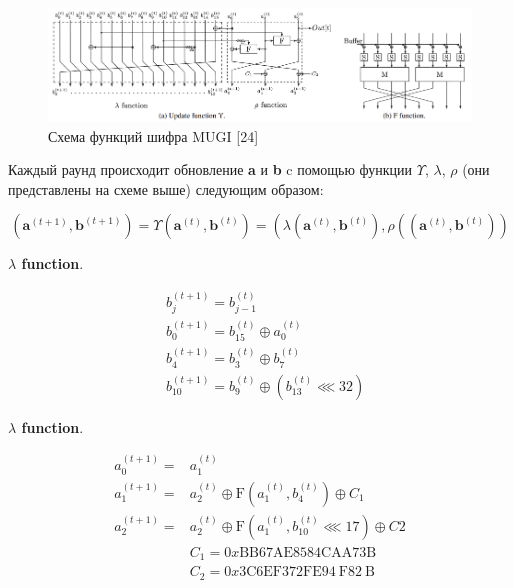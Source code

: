 \documentclass[colorthm]{./civarticle}
\begin{document}
\begin{figure}[H]
    \centering
    \includegraphics[width=1\linewidth]{Снимок экрана 2024-01-12 115522.png}
    \caption{Схема функций шифра MUGI [24]}
    \label{fig:enter-label}
\end{figure}

Каждый раунд происходит обновление \textbf{a} и \textbf{b} c помощью функции $\Upsilon$, $\lambda$, $\rho$ (они представлены на схеме выше) следующим образом:

\begin{equation}
    \left(\mathbf{a}^{(t+1)}, \mathbf{b}^{(t+1)}\right) =\Upsilon\left(\mathbf{a}^{(t)}, \mathbf{b}^{(t)}\right) 
=\left(\lambda\left(\mathbf{a}^{(t)}, \mathbf{b}^{(t)}\right), \rho\left(\left(\mathbf{a}^{(t)}, \mathbf{b}^{(t)}\right)\right)\right.
\end{equation}

\textbf{$\lambda$ function}.

\begin{equation}
    \begin{aligned}
& b_j^{(t+1)}=b_{j-1}^{(t)} \\
& b_0^{(t+1)}=b_{15}^{(t)} \oplus a_0^{(t)} \\
& b_4^{(t+1)}=b_3^{(t)} \oplus b_7^{(t)} \\
& b_{10}^{(t+1)}=b_9^{(t)} \oplus\left(b_{13}^{(t)} \lll 32\right)
\end{aligned}
\end{equation}

\textbf{$\lambda$ function}.

\begin{equation}
    \begin{aligned}
a_0^{(t+1)}= & a_1^{(t)} \\
a_1^{(t+1)}= & a_2^{(t)} \oplus \mathrm{F}\left(a_1^{(t)}, b_4^{(t)}\right) \oplus C_1 \\
a_2^{(t+1)}= & a_2^{(t)} \oplus \mathrm{F}\left(a_1^{(t)}, b_{10}^{(t)} \lll 17\right) \oplus C 2 \\
& C_1=0 x \mathrm{BB} 67 \mathrm{AE} 8584 \mathrm{CAA73B} \\
& C_2=0 x 3 \mathrm{C} 6 \mathrm{EF} 372 \mathrm{FE} 94 \mathrm{~F} 82 \mathrm{~B}
\end{aligned}
\end{equation}
\end{document}
